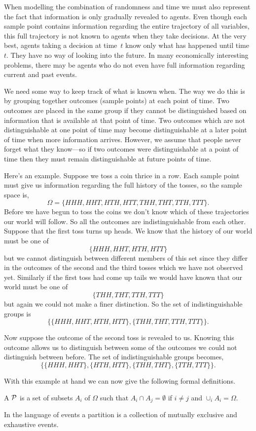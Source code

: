 \documentclass[11pt,reqno,openany]{amsbook}
\begin{document}
When modelling the combination of
randomness and time we must also represent the fact that
information is only gradually revealed to agents. Even
though each sample point contains information regarding the
entire trajectory of all variables, this full trajectory is
not known to agents when they take decisions. At the very
best, agents taking a decision at time~$t$ know only what
has happened until time~$t$. They have no way of looking
into the future. In many economically interesting problems,
there may be agents who do not even have full information
regarding current and past events. 

We need some way to keep track of what is known when. The
way we do this is by grouping together outcomes (sample
points) at each point of time. Two outcomes are placed in the
same group if they cannot be distinguished based on
information that is available at that point of time. Two
outcomes which are not distinguishable at one point of time
may become distinguishable at a later point of time when
more information arrives. However, we assume that people
never forget what they know---so if two outcomes were
distinguishable at a point of time then they must remain
distinguishable at future points of time.

Here's an example. Suppose we toss a coin thrice in a row.
Each sample point must give us information regarding the
full history of the tosses, so the sample space is,
\[\Omega=\{HHH,HHT,HTH,HTT,THH,THT,TTH,TTT\}.\]
Before we have begun to toss the coins we don't know which
of these trajectories our world will follow. So all the
outcomes are indistinguishable from each other. Suppose that
the first toss turns up heads. We know that the history of
our world must be one of 
\[\{HHH,HHT,HTH,HTT\}\]
 but we cannot
distinguish between different members of this set since they
differ in the outcomes of the second and the third tosses
which we have not observed yet. Similarly if the first toss
had come up tails we would have known that our world must be one
of 
\[\{THH,THT,TTH,TTT\}\]
 but again we could not make a finer
distinction. So the set of indistinguishable groups is 
\[\{\{HHH,HHT,HTH,HTT\},\{THH,THT,TTH,TTT\}\}.\]

Now suppose the outcome of the second toss is revealed to
us. Knowing this outcome allows us to distinguish between some of the
outcomes we could not distinguish between before. The set of
indistinguishable groups becomes,
\[\{\{HHH,HHT\},\{HTH,HTT\},\{THH,THT\},\{TTH,TTT\}\}.\]

With this example at hand we can now give the following
formal definitions.
\begin{defn}[Partition]
  A  $\mathcal{P}$ is a set of subsets
  $A_i$ of $\Omega$ such that $A_i \cap A_j = \emptyset$ if
  $i\ne j$ and $\cup_i A_i = \Omega$.
\end{defn}
In the language of events a partition is a collection of
mutually exclusive and exhaustive events. 
\end{document}
